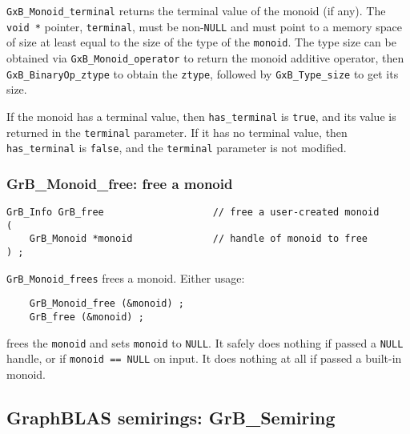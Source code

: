 \documentclass[12pt]{article}
\begin{document}
{\verb'GxB_Monoid_terminal' returns the terminal value of the monoid (if any).
The \verb'void *' pointer, \verb'terminal', must be non-\verb'NULL' and must
point to a memory space of size at least equal to the size of the type of the
\verb'monoid'.  The type size can be obtained via \verb'GxB_Monoid_operator' to
return the monoid additive operator, then \verb'GxB_BinaryOp_ztype' to obtain
the \verb'ztype', followed by \verb'GxB_Type_size' to get its size.

If the monoid has a terminal value, then \verb'has_terminal' is \verb'true',
and its value is returned in the \verb'terminal' parameter.  If it has no
terminal value, then \verb'has_terminal' is \verb'false', and the
\verb'terminal' parameter is not modified.

\subsubsection{{\sf GrB\_Monoid\_free:} free a monoid}
\label{monoid_free}

\begin{mdframed}[userdefinedwidth=6in]
{\footnotesize
\begin{verbatim}
GrB_Info GrB_free                   // free a user-created monoid
(
    GrB_Monoid *monoid              // handle of monoid to free
) ;
\end{verbatim}
} \end{mdframed}

\verb'GrB_Monoid_frees' frees a monoid.  Either usage:

    {\small
    \begin{verbatim}
    GrB_Monoid_free (&monoid) ;
    GrB_free (&monoid) ; \end{verbatim}}

\noindent
frees the \verb'monoid' and sets \verb'monoid' to \verb'NULL'.  It safely does
nothing if passed a \verb'NULL' handle, or if \verb'monoid == NULL' on input.
It does nothing at all if passed a built-in monoid.

\newpage
\subsection{GraphBLAS semirings: {\sf GrB\_Semiring}} %
\label{semiring}

}
\end{document}
